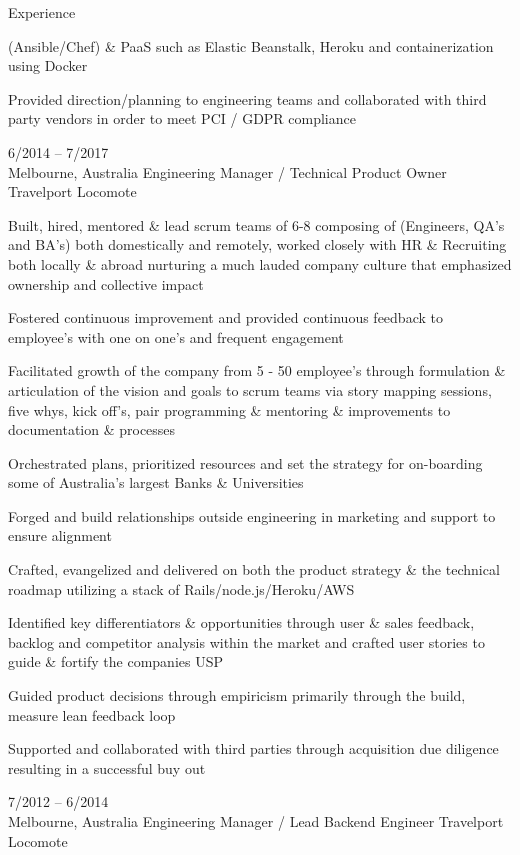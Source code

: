\documentclass[9pt]{developercv} %
\begin{document}
\begin{cvsect}{Experience}
\begin{entrylist}
{      (Ansible/Chef) \& PaaS such as Elastic Beanstalk, Heroku and
      containerization using Docker
  \par\medskip Provided direction/planning to engineering teams and collaborated with third party vendors in order to meet PCI / GDPR compliance
      }
    \entry
      {6/2014 -- 7/2017\\\footnotesize{Melbourne, Australia}}
      {Engineering Manager / Technical Product Owner}
      {Travelport Locomote}
      {Built, hired, mentored \& lead scrum teams of 6-8  composing of (Engineers,
      QA’s and BA’s) both domestically and remotely, worked closely with HR \&
      Recruiting both locally \& abroad nurturing a much lauded company culture
      that emphasized ownership and collective impact
      \par\medskip Fostered continuous improvement and provided continuous feedback to employee’s with one on one’s and frequent engagement
      \par\medskip Facilitated growth of the company from 5 - 50 employee’s through formulation \& articulation of the vision and goals to scrum teams via story mapping sessions, five whys, kick off's, pair programming \& mentoring \& improvements to documentation \& processes
      \par\medskip Orchestrated plans, prioritized resources and set the strategy for on-boarding some of Australia’s largest Banks \& Universities
      \par\medskip Forged and build relationships outside engineering in marketing and support to ensure alignment
      \par\medskip Crafted, evangelized and delivered on both the product strategy \& the technical roadmap  utilizing a stack of  Rails/node.js/Heroku/AWS
      \par\medskip Identified key differentiators \& opportunities through user \& sales feedback, backlog and competitor analysis within the market and crafted user stories to guide \& fortify the companies USP
      \par\medskip Guided product decisions through empiricism primarily through the build, measure lean feedback loop
      \par\medskip Supported and collaborated with third parties through acquisition due diligence resulting in a successful buy out}
    \entry
      {7/2012 -- 6/2014\\\footnotesize{Melbourne, Australia}}
      {Engineering Manager / Lead Backend Engineer}
      {Travelport Locomote}

\end{entrylist}
\end{cvsect}
\end{document}
